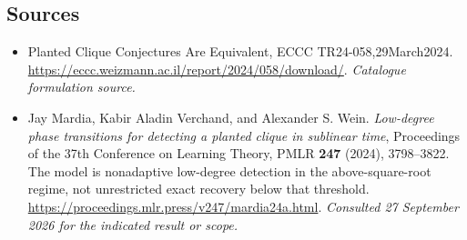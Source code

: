 \documentclass[11pt,a4paper]{article}
\numberwithin{equation}{section}
\begin{document}
\subsection{Sources}
\begin{itemize}\raggedright
\item[\textnormal{[S1]}]\hypertarget{source:30006743:1}{} Planted Clique Conjectures Are Equivalent, ECCC TR24-058,29March2024.
\url{https://eccc.weizmann.ac.il/report/2024/058/download/}.
{\small\textit{Catalogue formulation source.}}
\item[\textnormal{[E1]}]\hypertarget{extra:30006743:1}{} Jay Mardia, Kabir Aladin Verchand, and Alexander S. Wein.
\emph{Low-degree phase transitions for detecting a planted clique in sublinear time}, Proceedings of the 37th Conference on Learning Theory, PMLR \textbf{247} (2024), 3798--3822. The model is nonadaptive low-degree detection in the above-square-root regime, not unrestricted exact recovery below that threshold.
\url{https://proceedings.mlr.press/v247/mardia24a.html}.
{\small\textit{Consulted 27 September 2026 for the indicated result or scope.}}
\end{itemize}
\end{document}
